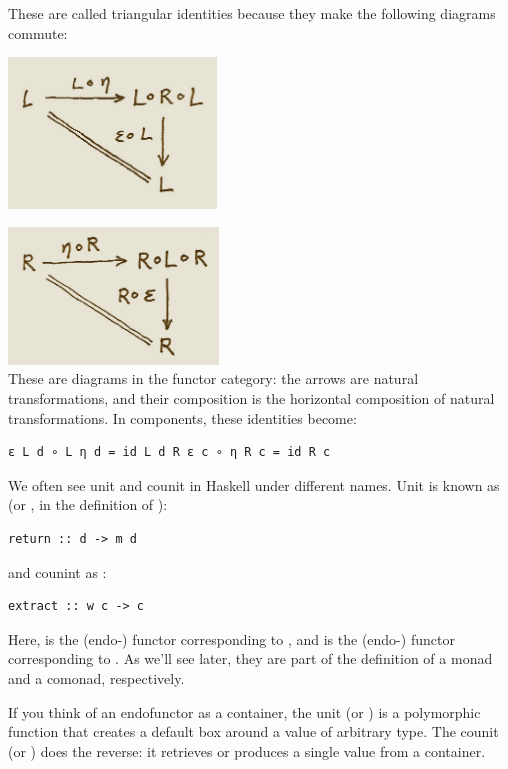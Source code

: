 These are called triangular identities because they make the following
diagrams commute:

\includegraphics[width=2.17708in]{images/triangles.png}

\includegraphics[width=2.19792in]{images/triangles-2.png}\\
These are diagrams in the functor category: the arrows are natural
transformations, and their composition is the horizontal composition of
natural transformations. In components, these identities become:

\begin{verbatim}
ε L d ∘ L η d = id L d R ε c ∘ η R c = id R c
\end{verbatim}

We often see unit and counit in Haskell under different names. Unit is
known as  (or , in the definition of
):

\begin{verbatim}
return :: d -> m d
\end{verbatim}

and counint as :

\begin{verbatim}
extract :: w c -> c
\end{verbatim}

Here,  is the (endo-) functor corresponding to ,
and  is the (endo-) functor corresponding to . As
we'll see later, they are part of the definition of a monad and a
comonad, respectively.

If you think of an endofunctor as a container, the unit (or
) is a polymorphic function that creates a default box
around a value of arbitrary type. The counit (or ) does
the reverse: it retrieves or produces a single value from a container.

